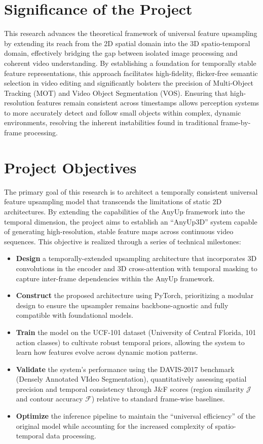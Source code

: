 \section{Significance of the Project}
This research advances the theoretical framework of universal feature upsampling by extending its reach from the 2D spatial domain into the 3D spatio-temporal domain, effectively bridging the gap between isolated image processing and coherent video understanding. By establishing a foundation for temporally stable feature representations, this approach facilitates high-fidelity, flicker-free semantic selection in video editing and significantly bolsters the precision of Multi-Object Tracking (MOT) and Video Object Segmentation (VOS). Ensuring that high-resolution features remain consistent across timestamps allows perception systems to more accurately detect and follow small objects within complex, dynamic environments, resolving the inherent instabilities found in traditional frame-by-frame processing.

\section{Project Objectives}
The primary goal of this research is to architect a temporally consistent universal feature upsampling model that transcends the limitations of static 2D architectures. By extending the capabilities of the AnyUp framework into the temporal dimension, the project aims to establish an ``AnyUp3D'' system capable of generating high-resolution, stable feature maps across continuous video sequences. This objective is realized through a series of technical milestones:

\begin{itemize}
\item \textbf{Design} a temporally-extended upsampling architecture that incorporates 3D convolutions in the encoder and 3D cross-attention with temporal masking to capture inter-frame dependencies within the AnyUp framework.
\item \textbf{Construct} the proposed architecture using PyTorch, prioritizing a modular design to ensure the upsampler remains backbone-agnostic and fully compatible with foundational models\@.
\item \textbf{Train} the model on the UCF-101 dataset (University of Central Florida, 101 action classes) to cultivate robust temporal priors, allowing the system to learn how features evolve across dynamic motion patterns.
\item \textbf{Validate} the system's performance using the DAVIS-2017 benchmark (Densely Annotated VIdeo Segmentation), quantitatively assessing spatial precision and temporal consistency through J\&F scores (region similarity $\mathcal{J}$ and contour accuracy $\mathcal{F}$) relative to standard frame-wise baselines.
\item \textbf{Optimize} the inference pipeline to maintain the ``universal efficiency'' of the original model while accounting for the increased complexity of spatio-temporal data processing.
\end{itemize}
